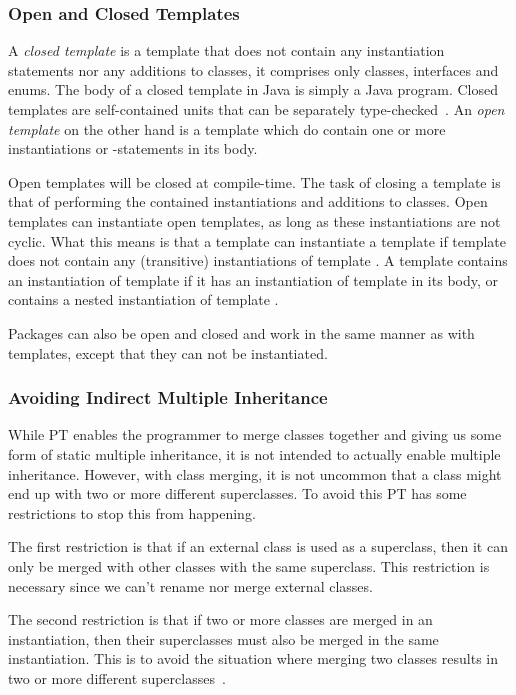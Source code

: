 \subsubsection{Open and Closed Templates}\label{subsubsec:open-and-closed-templates}

A \textit{closed template} is a template that does not contain any instantiation statements nor any additions to classes, it comprises only classes, interfaces and enums.
The body of a closed template in Java is simply a Java program.
Closed templates are self-contained units that can be separately type-checked~\cite{Axelsen2012}.
An \textit{open template} on the other hand is a template which do contain one or more instantiations or -statements in its body.

Open templates will be closed at compile-time.
The task of closing a template is that of performing the contained instantiations and additions to classes.
Open templates can instantiate open templates, as long as these instantiations are not cyclic.
What this means is that a template  can instantiate a template  if template  does not contain any (transitive) instantiations of template \@.
A template  contains an instantiation of template  if it has an instantiation of template  in its body, or contains a nested instantiation of template \@.

Packages can also be open and closed and work in the same manner as with templates, except that they can not be instantiated.

\subsubsection{Avoiding Indirect Multiple Inheritance}\label{subsubsec:avoiding-indirect-multiple-inheritance}

While PT enables the programmer to merge classes together and giving us some form of static multiple inheritance, it is not intended to actually enable multiple inheritance.
However, with class merging, it is not uncommon that a class might end up with two or more different superclasses.
To avoid this PT has some restrictions to stop this from happening.

The first restriction is that if an external class is used as a superclass, then it can only be merged with other classes with the same superclass.
This restriction is necessary since we can't rename nor merge external classes.

The second restriction is that if two or more classes are merged in an instantiation, then their superclasses must also be merged in the same instantiation.
This is to avoid the situation where merging two classes results in two or more different superclasses~\cite{jot}.
